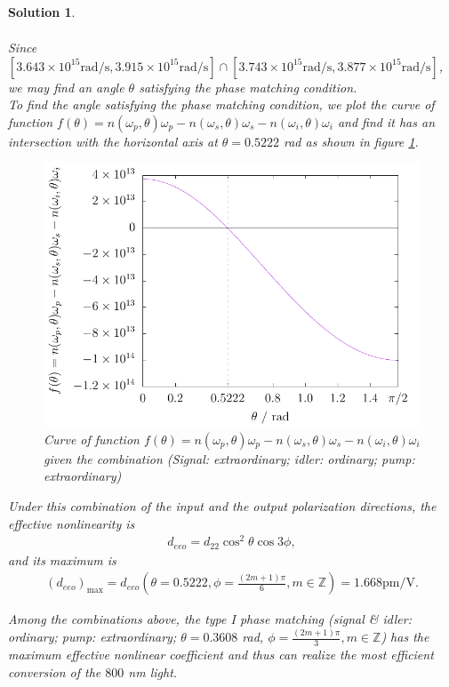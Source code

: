 \documentclass[UTF8,10pt,a4paper]{article}
\theoremstyle{Problem}
\theoremstyle{Solution}
\newtheorem*{sol}{Solution}
\begin{document}
\begin{sol}
\begin{enumerate}
\begin{enumerate}
\begin{gather}
            \end{gather}
            Since $[3.643\times 10^{15}\text{rad}/\text{s},3.915\times 10^{15}\text{rad}/\text{s}]\cap[3.743\times 10^{15}\text{rad}/\text{s},3.877\times 10^{15}\text{rad}/\text{s}]$, we may find an angle $\theta$ satisfying the phase matching condition.\\
            To find the angle satisfying the phase matching condition, we plot the curve of function $f(\theta)=n(\omega_p,\theta)\omega_p-n(\omega_s,\theta)\omega_s-n(\omega_i,\theta)\omega_i$ and find it has an intersection with the horizontal axis at $\theta=0.5222$ rad as shown in figure \ref{phase-matching-II-eeo}.
            \begin{figure}[h]
                \centering
                \includegraphics[width=.5\textwidth]{phase-matching-II-eeo.pdf}
                \caption{Curve of function $f(\theta)=n(\omega_p,\theta)\omega_p-n(\omega_s,\theta)\omega_s-n(\omega_i,\theta)\omega_i$ given the combination (Signal: extraordinary; idler: ordinary; pump: extraordinary)}
                \label{phase-matching-II-eeo}
            \end{figure}

            Under this combination of the input and the output polarization directions, the effective nonlinearity is
            \begin{align}
                d_{eeo}=d_{22}\cos^2\theta\cos 3\phi,
            \end{align}
            and its maximum is
            \begin{align}
                (d_{eeo})_{\max}=d_{eeo}(\theta=0.5222,\phi=\frac{(2m+1)\pi}{6},m\in\mathbb{Z})=1.668\text{pm}/\text{V}.
            \end{align}
        \end{enumerate}
    \end{enumerate}

    Among the combinations above, the type I phase matching (signal \& idler: ordinary; pump: extraordinary; $\theta=0.3608$ rad, $\phi=\frac{(2m+1)\pi}{3},m\in\mathbb{Z}$) has the maximum effective nonlinear coefficient and thus can realize the most efficient conversion of the $800$ nm light.


\end{sol}
\end{document}
